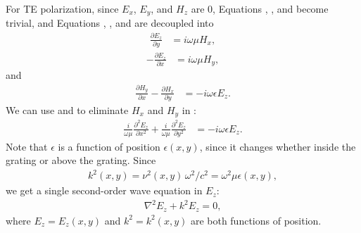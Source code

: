 For TE polarization, since $E_x$, $E_y$, and $H_z$ are 0, Equations , , and  become trivial, and Equations , , and  are decoupled into
\begin{align}
\frac{\partial E_z}{\partial y} &= i \omega \mu H_x,
\label{mete1}
\end{align}
\begin{align}
-\frac{\partial E_z}{\partial x} &= i \omega \mu H_y,
\label{mete2}
\end{align}
and
\begin{align}
\frac{\partial H_y}{\partial x} - \frac{\partial H_x}{\partial y} &= - i \omega \epsilon E_z.
\label{mete3}
\end{align}
We can use  and  to eliminate $H_x$ and $H_y$ in :
\begin{align}
\frac{i}{\omega \mu} \frac{\partial^2 E_z}{\partial x^2} + \frac{i}{\omega \mu}  \frac{\partial^2 E_z}{\partial y^2} &= -i \omega \epsilon E_z.
\label{mete4}
\end{align}
Note that $\epsilon$ is a function of position $\epsilon(x,y)$, since it changes whether inside the grating or above the grating.  Since 
\begin{align}
k^2(x, y) = \nu^2(x,y)\, \omega^2/c^2 = \omega^2 \mu \epsilon(x, y),
\end{align}
we get a single second-order wave equation in $E_z$:
\begin{align}
\nabla^2 E_z + k^2 E_z = 0,
\label{wete}
\end{align}
where $E_z = E_z(x,y)$ and $k^2 = k^2(x,y)$ are both functions of position.


